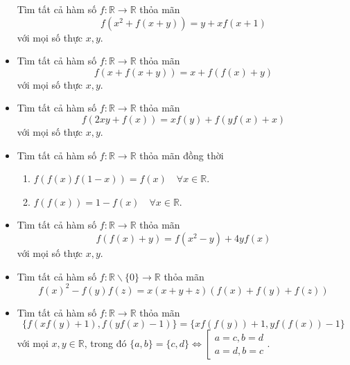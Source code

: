 \documentclass[11pt]{scrartcl}
\begin{document}
\begin{itemize}[label=, leftmargin=0em, itemsep=-0em]
\begin{btvn}
        Tìm tất cả hàm số $f: \mathbb{R} \rightarrow \mathbb{R}$ thỏa mãn
        $$
        f\left(x^2+f(x+y)\right)=y+x f(x+1)
        $$
        với mọi số thực $x, y$.
    \end{btvn}
    \item \begin{btvn}
        Tìm tất cả hàm số $f: \mathbb{R} \rightarrow \mathbb{R}$ thỏa mãn
        $$
        f(x + f(x + y)) = x + f(f(x) + y)
        $$
        với mọi số thực $x, y$.
    \end{btvn}
    \item \begin{btvn}
        Tìm tất cả hàm số $f: \mathbb{R} \rightarrow \mathbb{R}$ thỏa mãn
        $$
            f(2xy +f(x)) = xf(y) + f(yf(x) + x)
        $$
        với mọi số thực $x, y$.
    \end{btvn}
    \item \begin{btvn}
        Tìm tất cả hàm số $f: \mathbb{R} \rightarrow \mathbb{R}$ thỏa mãn đồng thời
        \begin{enumerate}
            \item $f(f(x) f(1-x))=f(x) \quad \forall x \in \mathbb{R}$.
            \item $f(f(x))=1-f(x) \quad \forall x \in \mathbb{R}$.
        \end{enumerate}
    \end{btvn}
    \item \begin{btvn}
        Tìm tất cả hàm số $f: \mathbb{R} \rightarrow \mathbb{R}$ thỏa mãn
            $$
            f(f(x)+y)=f\left(x^2-y\right)+4 y f(x)
            $$
            với mọi số thực $x, y$.
    \end{btvn}
    \item \begin{btvn}
        Tìm tất cả hàm số $f: \mathbb{R} \backslash\{0\} \rightarrow \mathbb{R}$ thỏa mãn
        $$
        f(x)^2-f(y) f(z)=x(x+y+z)(f(x)+f(y)+f(z))
        $$
    \end{btvn}
    \item \begin{btvn}
        Tìm tất cả hàm số $f: \mathbb{R} \rightarrow \mathbb{R}$ thỏa mãn
        $$
        \{f(x f(y)+1), f(y f(x)-1)\}=\{x f(f(y))+1, y f(f(x))-1\}
        $$
        với mọi $x, y \in \mathbb{R}$, trong đó $\{a, b\}=\{c, d\} \Longleftrightarrow\left[\begin{array}{l}a=c, b=d \\ a=d, b=c\end{array}\right.$.

\end{btvn}
\end{itemize}
\end{document}
